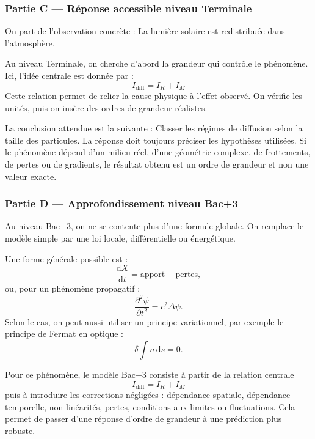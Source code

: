\documentclass[11pt,a4paper]{article}
\begin{document}
\subsubsection*{Partie C — Réponse accessible niveau Terminale}

\begin{corrigebox}
On part de l'observation concrète : La lumière solaire est redistribuée dans l'atmosphère.

Au niveau Terminale, on cherche d'abord la grandeur qui contrôle le phénomène. Ici, l'idée centrale est donnée par :
\[
I_{\mathrm{diff}}=I_R+I_M
\]
Cette relation permet de relier la cause physique à l'effet observé. On vérifie les unités, puis on insère des ordres de grandeur réalistes.

La conclusion attendue est la suivante : Classer les régimes de diffusion selon la taille des particules. La réponse doit toujours préciser les hypothèses utilisées. Si le phénomène dépend d'un milieu réel, d'une géométrie complexe, de frottements, de pertes ou de gradients, le résultat obtenu est un ordre de grandeur et non une valeur exacte.
\end{corrigebox}

\subsubsection*{Partie D — Approfondissement niveau Bac+3}

\begin{approfondissementbox}
Au niveau Bac+3, on ne se contente plus d'une formule globale. On remplace le modèle simple par une loi locale, différentielle ou énergétique.

Une forme générale possible est :
\[
\frac{\mathrm d X}{\mathrm dt}=\text{apport}-\text{pertes},
\]
ou, pour un phénomène propagatif :
\[
\frac{\partial^2 \psi}{\partial t^2}=c^2\Delta\psi.
\]
Selon le cas, on peut aussi utiliser un principe variationnel, par exemple le principe de Fermat en optique :
\[
\delta \int n\,\mathrm ds=0.
\]

Pour ce phénomène, le modèle Bac+3 consiste à partir de la relation centrale
\[
I_{\mathrm{diff}}=I_R+I_M
\]
puis à introduire les corrections négligées : dépendance spatiale, dépendance temporelle, non-linéarités, pertes, conditions aux limites ou fluctuations. Cela permet de passer d'une réponse d'ordre de grandeur à une prédiction plus robuste.
\end{approfondissementbox}
\end{document}
